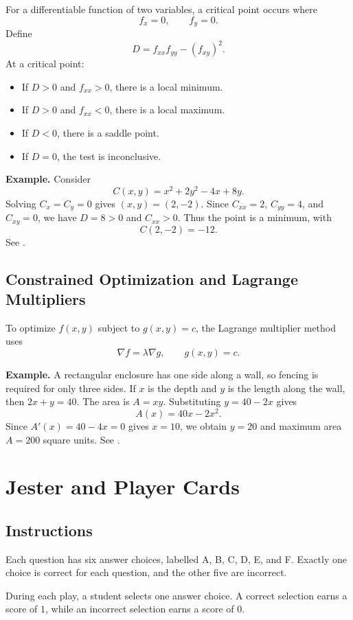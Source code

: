 \documentclass[a4paper,12pt]{article}
\theoremstyle{mystyle}
\numberwithin{equation}{section}
\numberwithin{theorem}{section}
\numberwithin{proposition}{section}
\numberwithin{example}{section}
\numberwithin{remark}{section}
\numberwithin{lemma}{section}
\numberwithin{corollary}{section}
\numberwithin{definition}{section}
\begin{document}
For a differentiable function of two variables, a critical point occurs where
\[
f_x=0,\qquad f_y=0.
\]
Define
\[
D=f_{xx}f_{yy}-(f_{xy})^2.
\]
At a critical point:
\begin{itemize}
\item If $D>0$ and $f_{xx}>0$, there is a local minimum.
\item If $D>0$ and $f_{xx}<0$, there is a local maximum.
\item If $D<0$, there is a saddle point.
\item If $D=0$, the test is inconclusive.
\end{itemize}

\textbf{Example.} Consider
\[
C(x,y)=x^2+2y^2-4x+8y.
\]
Solving $C_x=C_y=0$ gives $(x,y)=(2,-2)$. Since $C_{xx}=2$, $C_{yy}=4$, and $C_{xy}=0$, we have $D=8>0$ and $C_{xx}>0$. Thus the point is a minimum, with
\[
C(2,-2)=-12.
\]
See \cite[Section 4.7]{strangherman2016}.

\subsection{Constrained Optimization and Lagrange Multipliers}

To optimize $f(x,y)$ subject to $g(x,y)=c$, the Lagrange multiplier method uses
\[
\nabla f=\lambda\nabla g,
\qquad g(x,y)=c.
\]

\textbf{Example.} A rectangular enclosure has one side along a wall, so fencing is required for only three sides. If $x$ is the depth and $y$ is the length along the wall, then $2x+y=40$. The area is $A=xy$. Substituting $y=40-2x$ gives
\[
A(x)=40x-2x^2.
\]
Since $A'(x)=40-4x=0$ gives $x=10$, we obtain $y=20$ and maximum area $A=200$ square units. See \cite[Section 4.8]{strangherman2016}.

\section{Jester and Player Cards}
\label{S:3}
\subsection{Instructions}

Each question has six answer choices, labelled
A, B, C, D, E, and F. Exactly one choice is correct
for each question, and the other five are incorrect.

During each play, a student selects one answer choice.
A correct selection earns a score of $1$, while an
incorrect selection earns a score of $0$.
\end{document}
